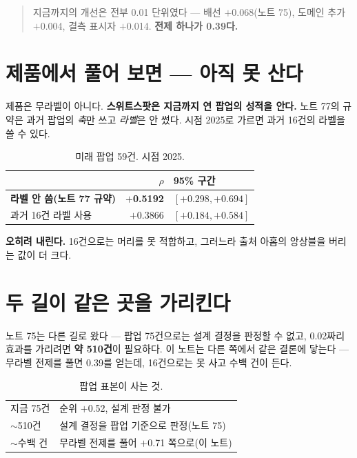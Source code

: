 \documentclass[10pt]{article}
\begin{document}
\begin{quote}\fontsize{9.5}{11.5}\selectfont
지금까지의 개선은 전부 0.01 단위였다 --- 배선 $+$0.068(노트 75), 도메인 추가
$+$0.004, 결측 표시자 $+$0.014. \textbf{전제 하나가 0.39다.}
\end{quote}

\section{제품에서 풀어 보면 --- 아직 못 산다}

제품은 무라벨이 아니다. \textbf{스위트스팟은 지금까지 연 팝업의 성적을 안다.}
노트 77의 규약은 과거 팝업의 \emph{축}만 쓰고 \emph{라벨}은 안 썼다. 시점 2025로
가르면 과거 16건의 라벨을 쓸 수 있다.

\begin{table}[t]
\centering\tsize
\caption{미래 팝업 59건. 시점 2025.}
\begin{tabular}{lrl}
\toprule
& $\rho$ & 95\% 구간 \\
\midrule
\textbf{라벨 안 씀(노트 77 규약)} & \textbf{$+$0.5192} & $[+0.298, +0.694]$ \\
과거 16건 라벨 사용 & $+$0.3866 & $[+0.184, +0.584]$ \\
\bottomrule
\end{tabular}
\end{table}

\textbf{오히려 내린다.} 16건으로는 머리를 못 적합하고, 그러느라 출처 아홉의
앙상블을 버리는 값이 더 크다.


\section{두 길이 같은 곳을 가리킨다}

노트 75는 다른 길로 왔다 --- 팝업 75건으로는 설계 결정을 판정할 수 없고,
0.02짜리 효과를 가리려면 \textbf{약 510건}이 필요하다. 이 노트는 다른 쪽에서
같은 결론에 닿는다 --- 무라벨 전제를 풀면 0.39를 얻는데, 16건으로는 못 사고
수백 건이 든다.

\begin{table}[t]
\centering\tsize
\caption{팝업 표본이 사는 것.}
\begin{tabular}{ll}
\toprule
지금 75건 & 순위 $+$0.52, 설계 판정 불가 \\
$\sim$510건 & 설계 결정을 팝업 기준으로 판정(노트 75) \\
$\sim$수백 건 & 무라벨 전제를 풀어 $+$0.71 쪽으로(이 노트) \\
\bottomrule
\end{tabular}
\end{table}
\end{document}
